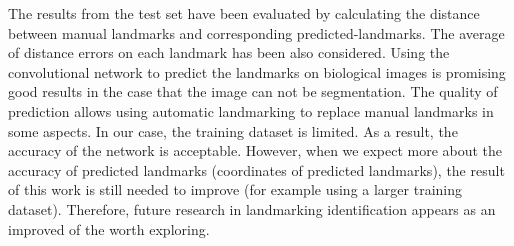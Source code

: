 \documentclass[conference]{IEEEtran}
\begin{document}
The results from the test set have been evaluated by calculating the distance between manual landmarks and corresponding predicted-landmarks. The average of distance errors on each landmark has been also considered. Using the convolutional network to predict the landmarks on biological images is promising good results in the case that the image can not be segmentation. The quality of prediction allows using automatic landmarking to replace manual landmarks in some aspects.  In our case, the training dataset is limited. As a result, the accuracy of the network is acceptable. However, when we expect more about the accuracy of predicted landmarks (coordinates of predicted landmarks), the result of this work is still needed to improve (for example using a larger training dataset). Therefore, future research in landmarking identification appears as an improved of the worth exploring.


\end{document}
